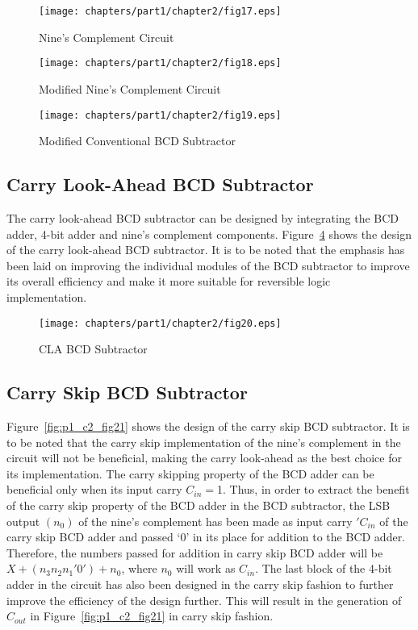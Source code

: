 \begin{figure}[!tbh]
	\centering
	\texttt{[image: chapters/part1/chapter2/fig17.eps]}
	\caption{Nine's Complement Circuit}
	\label{fig:p1_c2_fig17}
\end{figure}


\begin{figure}[!tbh]
	\centering
	\texttt{[image: chapters/part1/chapter2/fig18.eps]}
	\caption{Modified Nine's Complement Circuit}
	\label{fig:p1_c2_fig18}
\end{figure}

\begin{figure}[!tbh]
	\centering
	\texttt{[image: chapters/part1/chapter2/fig19.eps]}
	\caption{Modified Conventional BCD Subtractor}
	\label{fig:p1_c2_fig19}
\end{figure}

\subsection{Carry Look-Ahead BCD Subtractor}

The carry look-ahead BCD subtractor can be designed by integrating the BCD adder, 4-bit adder and nine's complement components. Figure~\ref{fig:p1_c2_fig20} shows the design of the carry look-ahead BCD subtractor. It is to be noted that the emphasis has been laid on improving the individual modules of the BCD subtractor to improve its overall efficiency and make it more suitable for reversible logic implementation.

\begin{figure}[!tbh]
	\centering
	\texttt{[image: chapters/part1/chapter2/fig20.eps]}
	\caption{CLA BCD Subtractor}
	\label{fig:p1_c2_fig20}
\end{figure}

\subsection{Carry Skip BCD Subtractor}

Figure~\ref{fig:p1_c2_fig21} shows the design of the carry skip BCD subtractor. It is to be noted that the carry skip implementation of the nine's complement in the circuit will not be beneficial, making the carry look-ahead as the best choice for its implementation. The carry skipping property of the BCD adder can be beneficial only when its input carry $C_{in}=$1. Thus, in order to extract the benefit of the carry skip property of the BCD adder in the BCD subtractor, the LSB output $(n_0)$ of the nine's complement has been made as input carry $'C_{in}$ of the carry skip BCD adder and passed `0' in its place for addition to the BCD adder. Therefore, the numbers passed for addition in carry skip BCD adder will be $X+(n_3 n_2 n_1'0')+n_0$, where $n_0$ will work as $C_{in}$. The last block of the 4-bit adder in the circuit has also been designed in the carry skip fashion to further improve the efficiency of the design further. This will result in the generation of $C_{out}$ in Figure~\ref{fig:p1_c2_fig21} in carry skip fashion. 


